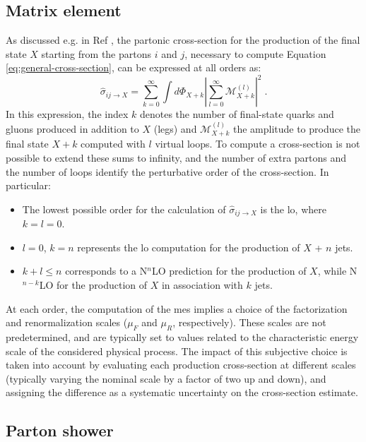 \subsection{Matrix element}

As discussed e.g. in Ref \cite{Skands:2011pf}, the partonic cross-section for the production of the final state $X$ starting from the partons $i$ and $j$, necessary to compute
Equation \ref{eq:general-cross-section}, can be expressed at all orders as:
\begin{equation}
\hat\sigma_{ij\rightarrow X} = \sum_{k=0}^\infty \int d\Phi_{X+k} | \sum_{l=0}^\infty \mathcal{M}_{X+k}^{(l)}|^2 \; .
\label{eq:xsec_matrix}
\end{equation}
\noindent In this expression, the index $k$ denotes the number of final-state quarks and gluons produced in addition to $X$ (legs) and $\mathcal{M}_{X+k}^{(l)}$
the amplitude to produce the final state $X+k$ computed with $l$ virtual loops. To compute a cross-section is not possible to extend these sums to infinity, and the number of extra partons and the number of loops identify the 
perturbative order of the cross-section. In particular:
\begin{itemize}
\item The lowest possible order for the calculation of $\hat{\sigma}_{ij \rightarrow X}$ is the \gls{lo}, where $k=l=0$.
\item $l=0$, $k=n$ represents the \gls{lo} computation for the production of $X$ + $n$ jets.
\item $k+l \leq n$ corresponds to a N$^n$LO prediction for the production of $X$, while N$^{n-k}$LO for the production of $X$ in association with $k$ jets.
\end{itemize}

At each order, the computation of the \glspl{me} implies a choice of the factorization and renormalization scales 
($\mu_F$ and $\mu_R$, respectively). 
These scales are not predetermined, and are typically set to values related to the characteristic energy scale of the considered physical process. 
The impact of this subjective choice is taken into account by evaluating each production cross-section at different scales (typically varying the nominal scale by a factor of two up and down), and assigning the difference as a systematic uncertainty on the cross-section estimate.


\subsection{Parton shower}

